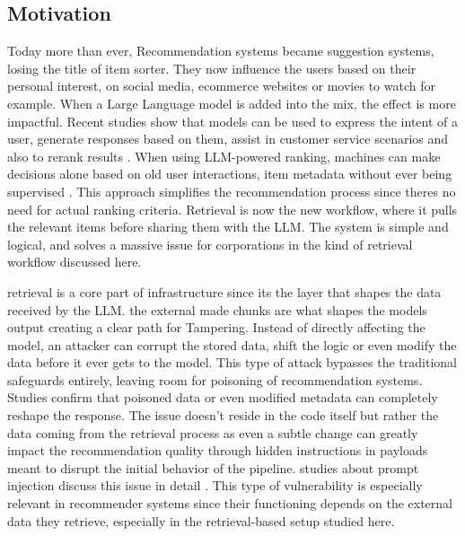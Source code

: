 \subsection{Motivation}

Today more than ever, Recommendation systems became suggestion systems, losing the title of item sorter. They now influence the users based on their personal interest, on social media, ecommerce websites or movies to watch for example. When a Large Language model is added into the mix, the effect is more impactful. Recent studies show that models can be used to express the intent of a user, generate responses based on them, assist in customer service scenarios and also to rerank results \cite{wu2024llmrecsurvey,zhao2024llmrecsystems}. When using LLM-powered ranking, machines can make decisions alone based on old user interactions, item metadata without ever being supervised \cite{hou2024llmrankers}. This approach simplifies the recommendation process since theres no need for actual ranking criteria. Retrieval is now the new workflow, where it pulls the relevant items before sharing them with the LLM. The system is simple and logical, and solves a massive issue for corporations in the kind of retrieval workflow discussed here\cite{lewis2020rag,gao2024ragsurvey}.

retrieval is a core part of infrastructure since its the layer that shapes the data received by the LLM. the external made chunks are what shapes the models output creating a clear path for Tampering. Instead of directly affecting the model, an attacker can corrupt the stored data, shift the logic or even modify the data before it ever gets to the model. This type of attack bypasses the traditional safeguards entirely, leaving room for poisoning of recommendation systems. Studies confirm that poisoned data or even modified metadata can completely reshape the response. The issue doesn't reside in the code itself but rather the data coming from the retrieval process as even a subtle change can greatly impact the recommendation quality through hidden instructions in payloads meant to disrupt the initial behavior of the pipeline. studies about prompt injection discuss this issue in detail \cite{greshake2023indirectpi,yi2025bipia}. This type of vulnerability is especially relevant in recommender systems since their functioning depends on the external data they retrieve, especially in the retrieval-based setup studied here\cite{zhong2023retrievalcorpora,zou2025poisonedrag_usenix,nguyen2024manipulatingrecsys,wang2024recpoisonsurvey}.

